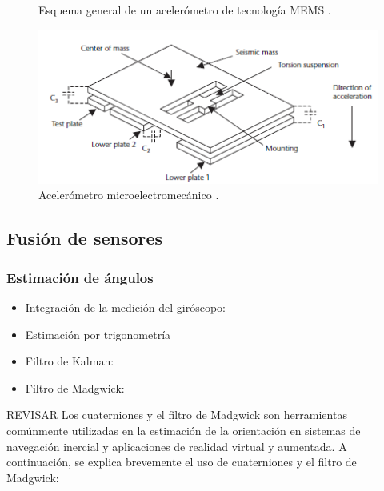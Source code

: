 \begin{itemize}
\begin{itemize}
\begin{figure}[H]
\begin{minipage}{0.45\textwidth}
                    \caption{Esquema general de un acelerómetro de tecnología MEMS \citep{dunn2005introduction}.}
                    \label{fig:acc-mems1}
                \end{minipage}
                \hfill
                \begin{minipage}{0.45\textwidth}
                    \centering
                    \includegraphics[width=1\textwidth]{imagenes/cap1_marcoteo/AccelerometerMEMS2.png}
                    \caption{Acelerómetro microelectromecánico \citep{dunn2005introduction}.}
                    \label{fig:acc-mems2}
                \end{minipage}
            \end{figure}
        \end{itemize}

    \end{itemize}

\subsection{Fusión de sensores}
\label{subsec:sensorfusion}

\subsubsection{Estimación de ángulos}

\begin{itemize}
    \item Integración de la medición del giróscopo:
    \item Estimación por trigonometría
	\item Filtro de Kalman:
	\item Filtro de Madgwick:
\end{itemize}

REVISAR
Los cuaterniones y el filtro de Madgwick son herramientas comúnmente utilizadas en la estimación de la orientación en sistemas de navegación inercial y aplicaciones de realidad virtual y aumentada. A continuación, se explica brevemente el uso de cuaterniones y el filtro de Madgwick:


